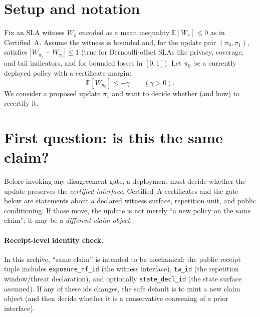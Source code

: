 \documentclass[11pt]{article}
\begin{document}
\section{Setup and notation}
Fix an SLA witness $W_\pi$ encoded as a mean inequality $\mathbb{E}[W_\pi]\le 0$ as in Certified~A.
Assume the witness is bounded and, for the update pair $(\pi_0,\pi_1)$, satisfies $|W_{\pi_1}-W_{\pi_0}|\le 1$ (true for Bernoulli-offset SLAs like privacy, coverage, and tail indicators, and for bounded losses in $[0,1]$).
Let $\pi_0$ be a currently deployed policy with a certificate margin:
\begin{equation}
\mathbb{E}[W_{\pi_0}] \le -\gamma
\qquad (\gamma>0).
\label{eq:margin}
\end{equation}
We consider a proposed update $\pi_1$ and want to decide whether (and how) to recertify it.

\section{First question: is this the same claim?}
Before invoking any disagreement gate, a deployment must decide whether the update preserves the \emph{certified interface}.
Certified~A certificates and the gate below are statements about a declared witness surface, repetition unit, and public conditioning.
If those move, the update is not merely ``a new policy on the same claim''; it may be a \emph{different claim object}.\cite{series:traceifaces,series:contractobjects}

\paragraph{Receipt-level identity check.}
In this archive, ``same claim'' is intended to be mechanical: the public receipt tuple includes \texttt{exposure\_nf\_id} (the witness interface), \texttt{tw\_id} (the repetition window/threat declaration), and optionally \texttt{state\_decl\_id} (the state surface assumed).
If any of these ids changes, the safe default is to mint a new claim object (and then decide whether it is a conservative coarsening of a prior interface).\cite{series:receiptitems,series:planstateequiv}
\end{document}
